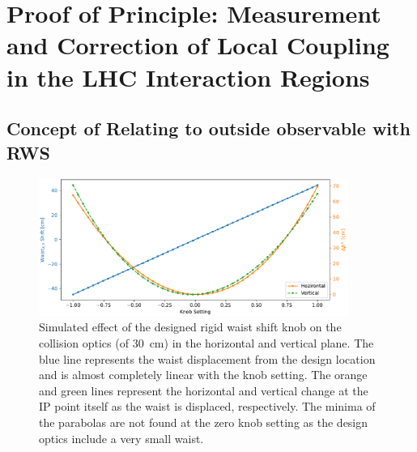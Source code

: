 

\section{Proof of Principle: Measurement and Correction of Local Coupling in the LHC Interaction Regions}

\subsection{Concept of Relating to outside observable with RWS}

\begin{figure}
    \centering
    \includegraphics[width=0.9\textwidth]{Figures/Chapter4/rigid_waist_shift_effect_combined.pdf}
    \caption{Simulated effect of the designed rigid waist shift knob on the collision optics (\betastar of \qty{30}{\centi\metre}) in the horizontal and vertical plane. The blue line represents the waist displacement from the design location and is almost completely linear with the knob setting. The orange and green lines represent the horizontal and vertical \betafunctions change at the IP point itself as the waist is displaced, respectively. The minima of the parabolas are not found at the zero knob setting as the design optics include a very small waist.}
    \label{fig:rigid_waist_shift_knob_effect}
\end{figure}

